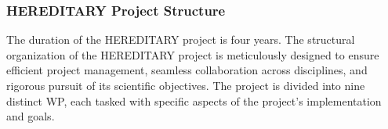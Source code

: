 \subsubsection{\ac{HEREDITARY} Project Structure}
The duration of the \ac{HEREDITARY} project is four years. The structural organization of the \ac{HEREDITARY} project is meticulously designed to ensure efficient project management, seamless collaboration across disciplines, and rigorous pursuit of its scientific objectives. The project is divided into nine distinct \ac{WP}, each tasked with specific aspects of the project's implementation and goals.